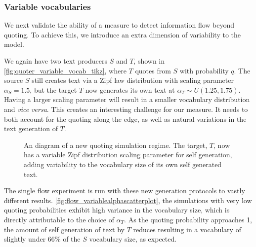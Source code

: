 \subsubsection{Variable vocabularies}
We next validate the ability of a measure to detect information flow beyond quoting. To achieve this, we introduce an extra dimension of variability to the model. 

We again have two text producers $S$ and $T$, shown in \autoref{fig:quoter_variable_vocab_tikz}, where $T$ quotes from $S$ with probability $q$. The source $S$ still creates text via a Zipf law distribution with scaling parameter $\alpha_S=1.5$, but the target $T$ now generates its own text at $\alpha_T \sim U(1.25,1.75)$. Having a larger scaling parameter will result in a smaller vocabulary distribution and \emph{vice versa}. This creates an interesting challenge for our measure. It needs to both account for the quoting along the edge, as well as natural variations in the text generation of $T$.

\begin{figure}[!htbp]
\centering
{}
\caption{An diagram of a new quoting simulation regime. The target, $T$, now has a variable Zipf distribution scaling parameter for self generation, adding variability to the vocabulary size of its own self generated text.}\label{fig:quoter_variable_vocab_tikz}
\end{figure}

The single flow experiment is run with these new generation protocols to vastly different results. \autoref{fig:flow_variablealphascatterplot}, the simulations with very low quoting probabilities exhibit high variance in the vocabulary size, which is directly attributable to the choice of $\alpha_T$. As the quoting probability approaches 1, the amount of self generation of text by $T$ reduces resulting in a vocabulary of slightly under 66\% of the $S$ vocabulary size, as expected.


